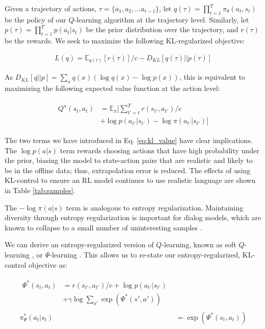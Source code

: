 Given a trajectory of actions, $\tau=\{a_1, a_2, ... a_{t-1}\}$, let $q(\tau) = \prod_{t=1}^T \pi_{\theta}(a_t, s_t)$ be the policy of our $Q$-learning algorithm at the trajectory level. Similarly, let $p(\tau) = \prod_{t=1}^T p(a_t|s_t)$ be the prior distribution over the trajectory, and $r(\tau)$ be the rewards. We seek to maximize the following KL-regularized objective:

\begin{align}
    L(q) = \mathbb{E}_{q(\tau)}[r(\tau)]/c - D_{KL}[q(\tau)||p(\tau)]
\end{align}

As $D_{KL}[q||p] = \sum_x q(x)(\log q(x)-\log p(x))$, this is equivalent to maximizing the following expected value function at the action level:

\begin{align}

    \label{eq:kl_value}
    \begin{split}
    Q^{\pi}(s_t, a_t)& = \mathbb{E}_{\pi}[\sum_{t'=t}^T r(s_{t'}, a_{t'})/c \\
    &+ \log p(a_{t'}|s_{t'}) - \log \pi(a_{t'}|s_{t'})]
    \end{split}

\end{align}

The two terms we have introduced in Eq. \ref{eq:kl_value} have clear implications. The $\log p(a|s)$ term rewards choosing actions that have high probability under the prior, biasing the model to state-action pairs that are realistic and likely to be in the offline data; thus, extrapolation error is reduced. The effects of using KL-control to ensure an RL model continues to use realistic language are shown in Table \ref{tab:samples}.

The $-\log \pi(a|s)$ term is analogous to entropy regularization. Maintaining diversity through entropy regularization is important for dialog models, which are known to collapse to a small number of uninteresting samples \cite{li2016dialogue}. 

We can derive an entropy-regularized version of $Q$-learning, known as soft $Q$-learning \cite{haarnoja2017reinforcement}, or $\Psi$-learning \cite{jaques2017sequence,rawlik2012stochastic}. This allows us to re-state our entropy-regularized, KL-control objective as:

\begin{align}
    \begin{split}
    \Psi^*(s_t, a_t) &= r(s_{t'}, a_{t'})/c + \log p(a_{t'}|s_{t'})  \\
    &+ \gamma \log \sum_{a'}\exp(\Psi^*(s', a'))
    \end{split}\\
    \pi^*_{\Psi}(a_t|s_t) &= \exp(\Psi^*(s_t, a_t))
\end{align}


